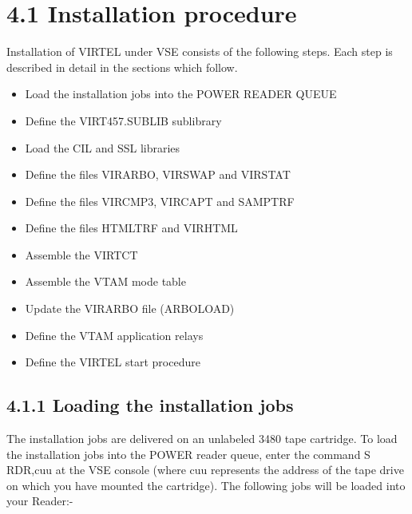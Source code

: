 \documentclass[letterpaper,10pt,english]{sphinxmanual}
\begin{document}
\section{4.1 Installation procedure}
\label{\detokenize{Installation_Guide:id1}}
Installation of VIRTEL under VSE consists of the following steps. Each step is described in detail in the sections which follow.
\begin{itemize}
\item {} 
Load the installation jobs into the POWER READER QUEUE

\item {} 
Define the VIRT457.SUBLIB sublibrary

\item {} 
Load the CIL and SSL libraries

\item {} 
Define the files VIRARBO, VIRSWAP and VIRSTAT

\item {} 
Define the files VIRCMP3, VIRCAPT and SAMPTRF

\item {} 
Define the files HTMLTRF and VIRHTML

\item {} 
Assemble the VIRTCT

\item {} 
Assemble the VTAM mode table

\item {} 
Update the VIRARBO file (ARBOLOAD)

\item {} 
Define the VTAM application relays

\item {} 
Define the VIRTEL start procedure

\end{itemize}


\subsection{4.1.1 Loading the installation jobs}
\label{\detokenize{Installation_Guide:loading-the-installation-jobs}}
The installation jobs are delivered on an unlabeled 3480 tape cartridge. To load the installation jobs into the POWER reader queue, enter the command S RDR,cuu at the VSE console (where cuu represents the address of the tape drive on which you have mounted the cartridge). The following jobs will be loaded into your Reader:-

\begin{sphinxVerbatim}[commandchars=\\\{\}]
   
\end{sphinxVerbatim}
\end{document}
